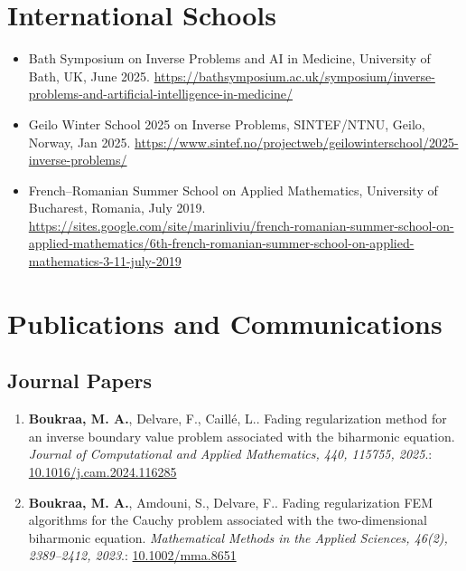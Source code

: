 \documentclass[10pt]{article}
\begin{document}
\section*{International Schools}
\begin{itemize}
  \item Bath Symposium on Inverse Problems and AI in Medicine, University of Bath, UK, June 2025. \url{https://bathsymposium.ac.uk/symposium/inverse-problems-and-artificial-intelligence-in-medicine/}
  \item Geilo Winter School 2025 on Inverse Problems, SINTEF/NTNU, Geilo, Norway, Jan 2025. \url{https://www.sintef.no/projectweb/geilowinterschool/2025-inverse-problems/}
  \item French–Romanian Summer School on Applied Mathematics, University of Bucharest, Romania, July 2019. \url{https://sites.google.com/site/marinliviu/french-romanian-summer-school-on-applied-mathematics/6th-french-romanian-summer-school-on-applied-mathematics-3-11-july-2019}
\end{itemize}

\section{Publications and Communications}
\subsection{Journal Papers}
\begin{enumerate}
\item \textbf{Boukraa, M. A.}, Delvare, F., Caill{\'e}, L.. Fading regularization method for an inverse boundary value problem associated with the biharmonic equation. \textit{Journal of Computational and Applied Mathematics, 440, 115755, 2025}.: \href{https://doi.org/10.1016/j.cam.2024.116285}{10.1016/j.cam.2024.116285}
\item \textbf{Boukraa, M. A.}, Amdouni, S., Delvare, F.. Fading regularization FEM algorithms for the Cauchy problem associated with the two-dimensional biharmonic equation. \textit{Mathematical Methods in the Applied Sciences, 46(2), 2389--2412, 2023}.: \href{https://doi.org/10.1002/mma.8651}{10.1002/mma.8651}
\end{enumerate}
\end{document}

